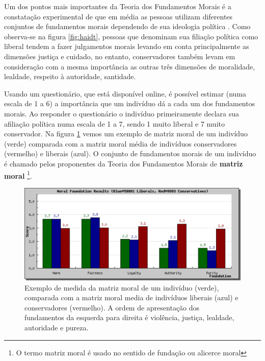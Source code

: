\newpage
Um dos pontos mais importantes da Teoria dos Fundamentos Morais é a
constatação experimental de que em média as pessoas utilizam diferentes
conjuntos de fundamentos morais dependendo de sua ideologia política
\citep{Haidt2007,Haidt2009}\cite{Haidt2007,Haidt2009}.  Como observa-se
na figura \ref{fig:haidt}, pessoas que denominam sua filiação política
como {\blue liberal} tendem a fazer julgamentos morais levando em conta
principalmente as dimensões {\blue justiça e cuidado}, no entanto, {\red
conservadores} também levam em consideração com a mesma importância as
outras três dimensões de moralidade, {\red lealdade, respeito à autoridade,
santidade}.

Usando um questionário, que está disponível online, é
possível estimar (numa escala de 1 a 6) a importância que um indivíduo dá
a cada um dos fundamentos morais. Ao responder o questionário o indivíduo
primeiramente declara sua afiliação política numa escala de 1 a 7, sendo
1 muito liberal e 7 muito conservador.  Na figura \ref{fig:moralmatrix}
vemos um exemplo de matriz moral de um indivíduo (verde) comparada com a
matriz moral média de indivíduos conservadores (vermelho) e liberais (azul).
O conjunto de fundamentos morais de um indivíduo é chamado pelos proponentes
da Teoria dos Fundamentos Morais de \textbf{matriz moral} \footnote{O termo
matriz moral é  usado no sentido de fundação ou alicerce moral}.

\begin{figure} 
    \centering
    \includegraphics[scale=0.4]{Figures/moralmatrix}
    \caption{
        Exemplo de medida da matriz moral de um indivíduo (verde), comparada
        com a matriz moral media de indivíduos liberais (azul) e conservadores
        (vermelho). A ordem de apresentação dos fundamentos da esquerda
        para direita é violência, justiça, lealdade, autoridade e pureza.
    }
    \label{fig:moralmatrix}
\end{figure}

